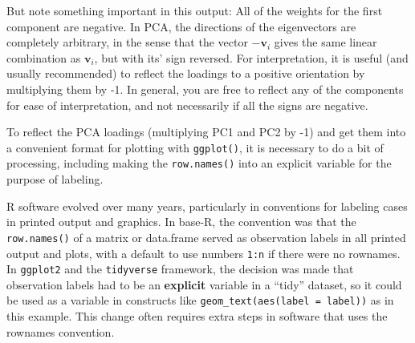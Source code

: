\documentclass[
  letterpaper,
  10pt,
  krantz2]{krantz}
\begin{document}
But note something important in this output: All of the weights for the
first component are negative. In PCA, the directions of the eigenvectors
are completely arbitrary, in the sense that the vector \(-\mathbf{v}_i\)
gives the same linear combination as \(\mathbf{v}_i\), but with its'
sign reversed. For interpretation, it is useful (and usually
recommended) to reflect the loadings to a positive orientation by
multiplying them by -1. In general, you are free to reflect any of the
components for ease of interpretation, and not necessarily if all the
signs are negative.

To reflect the PCA loadings (multiplying PC1 and PC2 by -1) and get them
into a convenient format for plotting with \texttt{ggplot()}, it is
necessary to do a bit of processing, including making the
\texttt{row.names()} into an explicit variable for the purpose of
labeling.

\begin{tcolorbox}[enhanced jigsaw, leftrule=.75mm, toprule=.15mm, bottomtitle=1mm, opacityback=0, colbacktitle=quarto-callout-warning-color!10!white, breakable, opacitybacktitle=0.6, colback=white, coltitle=black, toptitle=1mm, titlerule=0mm, rightrule=.15mm, title=\textcolor{quarto-callout-warning-color}{\faExclamationTriangle}\hspace{0.5em}{\texttt{rownames} in R}, colframe=quarto-callout-warning-color-frame, arc=.35mm, bottomrule=.15mm, left=2mm]

R software evolved over many years, particularly in conventions for
labeling cases in printed output and graphics. In base-R, the convention
was that the \texttt{row.names()} of a matrix or data.frame served as
observation labels in all printed output and plots, with a default to
use numbers \texttt{1:n} if there were no rownames. In \texttt{ggplot2}
and the \texttt{tidyverse} framework, the decision was made that
observation labels had to be an \textbf{explicit} variable in a ``tidy''
dataset, so it could be used as a variable in constructs like
\texttt{geom\_text(aes(label\ =\ label))} as in this example. This
change often requires extra steps in software that uses the rownames
convention.

\end{tcolorbox}
\end{document}
